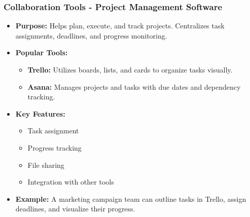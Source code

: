 \documentclass[aspectratio=169]{beamer}
\begin{document}
\begin{frame}[fragile]
    \frametitle{Collaboration Tools - Project Management Software}
    \begin{itemize}
        \item \textbf{Purpose:} Helps plan, execute, and track projects. Centralizes task assignments, deadlines, and progress monitoring.
        
        \item \textbf{Popular Tools:}
            \begin{itemize}
                \item \textbf{Trello:} Utilizes boards, lists, and cards to organize tasks visually.
                \item \textbf{Asana:} Manages projects and tasks with due dates and dependency tracking.
            \end{itemize}
        
        \item \textbf{Key Features:}
            \begin{itemize}
                \item Task assignment
                \item Progress tracking
                \item File sharing
                \item Integration with other tools
            \end{itemize}
        
        \item \textbf{Example:} A marketing campaign team can outline tasks in Trello, assign deadlines, and visualize their progress.
    \end{itemize}
\end{frame}
\end{document}
